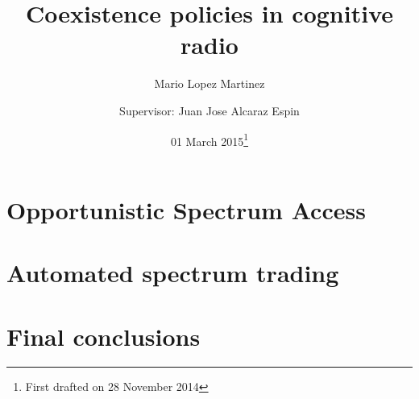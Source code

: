 \documentclass[12pt,a4paper,twoside]{memoir}
\begin{document}
\title{Coexistence policies in cognitive radio}
\author{Mario Lopez Martinez \and
Supervisor: Juan Jose Alcaraz Espin}
\date{01 March 2015\thanks{First drafted on 28 November 2014}}

\frontmatter
\maketitle
%
\clearpage
\tableofcontents
\clearpage
\listoffigures
\clearpage
\listoftables
\clearpage


\mainmatter

\part{Opportunistic Spectrum Access}\label{part_OSA}
%
%
%



\part{Automated spectrum trading}\label{part_auto}
%
%
%

\backmatter
\part{Final conclusions}
%

\end{document}
